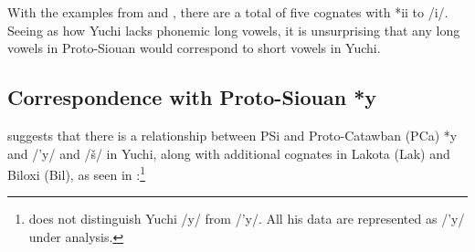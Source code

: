 \documentclass[output=paper]{LSP/langsci}
\begin{document}
With the examples from  and , there are a total of five cognates with *ii to /i/. Seeing as how Yuchi lacks phonemic long vowels, it is unsurprising that any long vowels in Proto-Siouan would correspond to short vowels in Yuchi.  

\subsection{Correspondence with Proto-Siouan *y}

\citet{Carter1980} suggests that there is a relationship between PSi and Proto-Catawban (PCa) *y and /'y/ and /\v{s}/ in Yuchi, along with additional cognates in Lakota (Lak) and Biloxi (Bil), as seen in :\footnote{\citet{Carter1980} does not distinguish Yuchi /y/ from /'y/. All his data are represented as /'y/ under  analysis.}

\begin{table}
\caption{Correspondences between PSi *y and Yuchi /'y/ and /\v{s}/}\label{*y}
\end{table}
\end{document}
